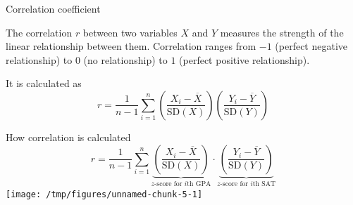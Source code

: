 \documentclass{beamer}\usepackage[]{graphicx}\usepackage[]{color}
\makeatletter
\newcommand{\hlstr}[1]{\textcolor[rgb]{1,0.894,0.71}{#1}}%
\newcommand{\hlopt}[1]{\textcolor[rgb]{1,0.894,0.769}{#1}}%
\newcommand{\hlstd}[1]{\textcolor[rgb]{1,0.894,0.769}{#1}}%
\newcommand{\hlkwc}[1]{\textcolor[rgb]{0.78,0.941,0.545}{#1}}%
\newcommand{\hlkwd}[1]{\textcolor[rgb]{1,0.78,0.769}{#1}}%
\newenvironment{kframe}{%
 \def\at@end@of@kframe{}%
 \ifinner\ifhmode%
  \def\at@end@of@kframe{\end{minipage}}%
  \begin{minipage}{\columnwidth}%
 \fi\fi%
 \def\FrameCommand##1{\hskip\@totalleftmargin \hskip-\fboxsep
 \colorbox{shadecolor}{##1}\hskip-\fboxsep
     \hskip-\linewidth \hskip-\@totalleftmargin \hskip\columnwidth}%
 \MakeFramed {\advance\hsize-\width
   \@totalleftmargin\z@ \linewidth\hsize
   \@setminipage}}%
 {\par\unskip\endMakeFramed%
 \at@end@of@kframe}
\newenvironment{knitrout}{}{} %
\makeatother
\begin{document}
\begin{darkframes}
\begin{frame}[fragile]
\begin{knitrout}
\end{knitrout}
    \end{frame}


    \begin{frame}{Correlation coefficient}
      \begin{definition}
        The \alert{correlation} $r$ between two variables $X$ and $Y$ measures the strength of the linear relationship between them. Correlation ranges from $-1$ (perfect negative relationship) to $0$ (no relationship) to $1$ (perfect positive relationship).
      \end{definition}
      \pause 
      It is calculated as
      \[ 
        r = \frac{1}{n-1} \sum_{i=1}^n 
        \left( \frac{X_i-\overline{X}}{\text{SD}(X)} \right) 
        \left( \frac{Y_i-\overline{Y}}{\text{SD}(Y)} \right)  
      \]
    \end{frame}

    \begin{frame}[fragile]{How correlation is calculated}
      \[ 
        r = \frac{1}{n-1} \sum_{i=1}^n 
        \underbrace{ \left( \frac{X_i-\overline{X}}{\text{SD}(X)} \right) }_{\text{$z$-score for $i$th GPA}} 
        \cdot
        \underbrace{ \left( \frac{Y_i-\overline{Y}}{\text{SD}(Y)} \right) }_{\text{$z$-score for $i$th SAT}} 
      \]
\begin{knitrout}
\color{fgcolor}
\texttt{[image: /tmp/figures/unnamed-chunk-5-1]} 

\end{knitrout}
    \end{frame}


\end{darkframes}
\end{document}
